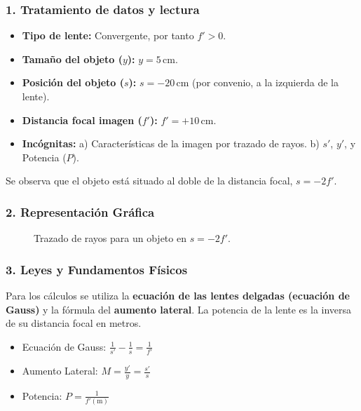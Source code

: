\subsubsection*{1. Tratamiento de datos y lectura}
\begin{itemize}
    \item \textbf{Tipo de lente:} Convergente, por tanto $f' > 0$.
    \item \textbf{Tamaño del objeto ($y$):} $y = 5\,\text{cm}$.
    \item \textbf{Posición del objeto ($s$):} $s = -20\,\text{cm}$ (por convenio, a la izquierda de la lente).
    \item \textbf{Distancia focal imagen ($f'$):} $f' = +10\,\text{cm}$.
    \item \textbf{Incógnitas:} a) Características de la imagen por trazado de rayos. b) $s'$, $y'$, y Potencia ($P$).
\end{itemize}
Se observa que el objeto está situado al doble de la distancia focal, $s = -2f'$.

\subsubsection*{2. Representación Gráfica}
\begin{figure}[H]
    \centering
    \caption{Trazado de rayos para un objeto en $s=-2f'$.}
\end{figure}

\subsubsection*{3. Leyes y Fundamentos Físicos}
Para los cálculos se utiliza la \textbf{ecuación de las lentes delgadas (ecuación de Gauss)} y la fórmula del \textbf{aumento lateral}. La potencia de la lente es la inversa de su distancia focal en metros.
\begin{itemize}
    \item Ecuación de Gauss: $\frac{1}{s'} - \frac{1}{s} = \frac{1}{f'}$
    \item Aumento Lateral: $M = \frac{y'}{y} = \frac{s'}{s}$
    \item Potencia: $P = \frac{1}{f'(\text{m})}$
\end{itemize}

